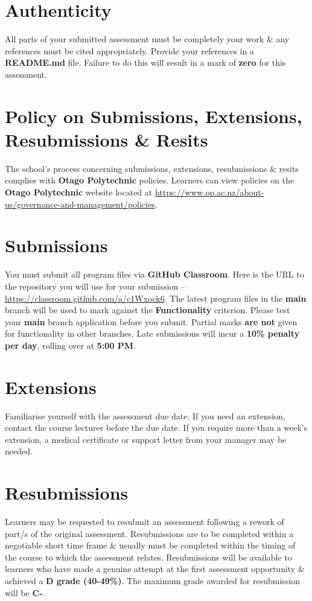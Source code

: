 \documentclass{article}
\begin{document}
\section*{Authenticity}
All parts of your submitted assessment must be completely your work \& any references must be cited appropriately. Provide your references in a \textbf{README.md} file. Failure to do this will result in a mark of \textbf{zero} for this assessment.

\section*{Policy on Submissions, Extensions, Resubmissions \& Resits}
The school's process concerning submissions, extensions, resubmissions \& resits complies with \textbf{Otago Polytechnic} policies. Learners can view policies on the \textbf{Otago Polytechnic} website located at \href{https://www.op.ac.nz/about-us/governance-and-management/policies}{https://www.op.ac.nz/about-us/governance-and-management/policies}.

\section*{Submissions}
You must submit all program files via \textbf{GitHub Classroom}. Here is the URL to the repository you will use for your submission – \href{https://classroom.github.com/a/c1Wxock6}{https://classroom.github.com/a/c1Wxock6}. The latest program files in the \textbf{main} branch will be used to mark against the \textbf{Functionality} criterion. Please test your \textbf{main} branch application before you submit. Partial marks \textbf{are not} given for functionality in other branches. Late submissions will incur a \textbf{10\% penalty per day}, rolling over at \textbf{5:00 PM}.

\section*{Extensions}
Familiarise yourself with the assessment due date. If you need an extension, contact the course lecturer before the due date. If you require more than a week's extension, a medical certificate or support letter from your manager may be needed.

\section*{Resubmissions}
Learners may be requested to resubmit an assessment following a rework of part/s of the original assessment. Resubmissions are to be completed within a negotiable short time frame \& usually must be completed within the timing of the course to which the assessment relates. Resubmissions will be available to learners who have made a genuine attempt at the first assessment opportunity \& achieved a \textbf{D grade (40-49\%)}. The maximum grade awarded for resubmission will be \textbf{C-}.
\end{document}
